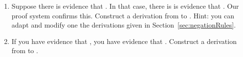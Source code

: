 \begin{enumerate}
\begin{argument*}











\end{argument*}

 \item Suppose there is evidence that . In that case,  
  there is is evidence that . Our proof system 
  confirms this. Construct a derivation from  
  to . Hint: you can adapt and 
  modify one the derivations given in Section~\ref{sec:negationRules}.

 \item If you have evidence that , you have evidence 
  that . Construct a derivation from  to .

\end{enumerate}




